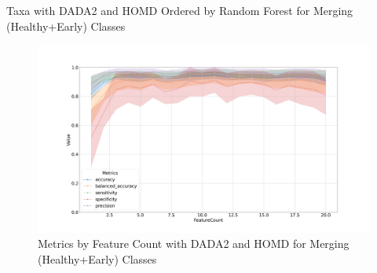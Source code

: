 \documentclass[a4paper]{article}
\begin{document}
{            \begin{table}[p]
                \centering
                \caption{Taxa with DADA2 and HOMD Ordered by Random Forest for Merging (Healthy+Early) Classes}
                \label{tb:RF-HE-DADA2-homd}

            \end{table}

            \begin{figure}[p]
                \centering
                \includegraphics[width=0.7 \linewidth]{figures/RandomForest/one.DADA2.homd/metrics.png}
                \caption{Metrics by Feature Count with DADA2 and HOMD for Merging (Healthy+Early) Classes}
                \label{fig:RF-HE-metrics-DADA2-homd}
            \end{figure}

}
\end{document}
